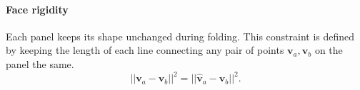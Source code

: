 

\paragraph{Face rigidity} 
Each panel keeps its shape unchanged during folding. This constraint is defined by keeping the length of each line connecting any pair of points $\mathbf{v}_{a}, \mathbf{v}_{b}$ on the panel the same.
\begin{equation}
||\mathbf{v}_{a} - \mathbf{v}_{b}||^2 = ||\hat{\mathbf{v}}_{a} - \hat{\mathbf{v}}_{b}||^2.
\label{equ:plane}
\end{equation}





